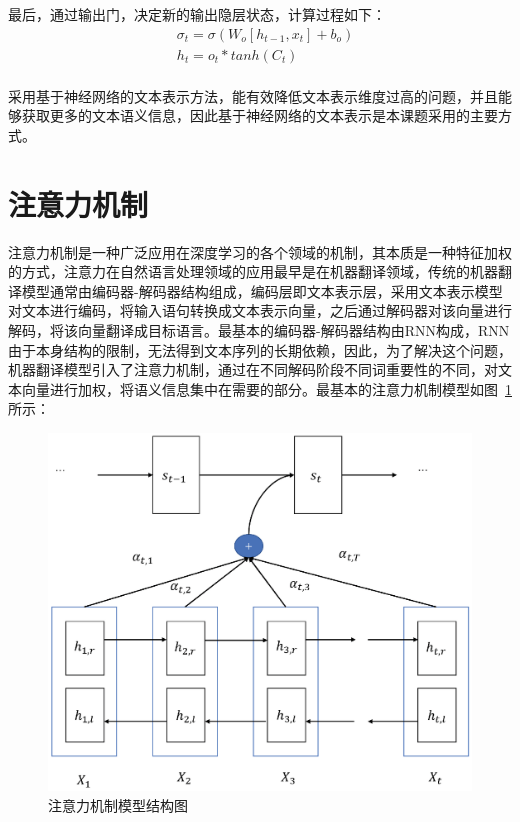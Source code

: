 最后，通过输出门，决定新的输出隐层状态，计算过程如下：
\begin{equation}
    \begin{aligned}
        & \sigma_t=\sigma(W_o[h_{t-1},x_t]+b_o) \\
        & h_t=o_t*tanh(C_t)\\
    \end{aligned}
\end{equation}

采用基于神经网络的文本表示方法，能有效降低文本表示维度过高的问题，并且能够获取更多的文本语义信息，因此基于神经网络的文本表示是本课题采用的主要方式。

\section{注意力机制}

注意力机制是一种广泛应用在深度学习的各个领域的机制，其本质是一种特征加权的方式，注意力在自然语言处理领域的应用最早是在机器翻译领域\cite{bahdanau2014neural}，传统的机器翻译模型通常由编码器-解码器结构组成，编码层即文本表示层，采用文本表示模型对文本进行编码，将输入语句转换成文本表示向量，之后通过解码器对该向量进行解码，将该向量翻译成目标语言。最基本的编码器-解码器结构由RNN构成，RNN由于本身结构的限制，无法得到文本序列的长期依赖，因此，为了解决这个问题，机器翻译模型引入了注意力机制，通过在不同解码阶段不同词重要性的不同，对文本向量进行加权，将语义信息集中在需要的部分。最基本的注意力机制模型如图~\ref{fig:attention}所示：
\begin{figure}[htb]
    \centering
    \includegraphics[scale=0.5, clip=true]{./sources/rel_attention.eps}
    \vspace{-10pt}
    \caption{\label{fig:attention} 注意力机制模型结构图}
    \vspace{-5pt}
\end{figure}

